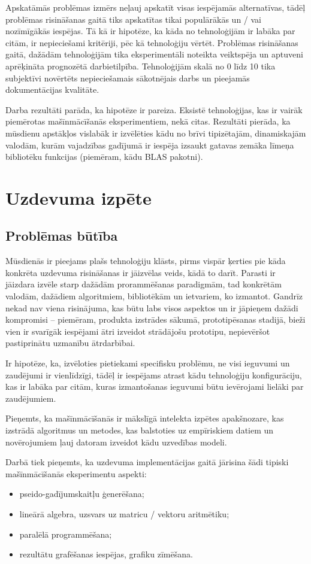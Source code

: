 \documentclass{ludis}
\begin{document}
Apskatāmās problēmas izmērs neļauj apskatīt visas iespējamās alternatīvas, tādēļ problēmas risināšanas gaitā tiks apskatītas tikai populārākās un / vai nozīmīgākās iespējas. Tā kā ir hipotēze, ka kāda no tehnoloģijām ir labāka par citām, ir nepieciešami kritēriji, pēc kā tehnoloģiju vērtēt. Problēmas risināšanas gaitā, dažādām tehnoloģijām tika eksperimentāli noteikta veiktspēja un aptuveni aprēķināta prognozētā darbietilpība. Tehnoloģijām skalā no 0 līdz 10 tika subjektīvi novērtēts nepieciešamais sākotnējais darbs un pieejamās dokumentācijas kvalitāte.

Darba rezultāti parāda, ka hipotēze ir pareiza. Eksistē tehnoloģijas, kas ir vairāk piemērotas mašīnmācīšanās eksperimentiem, nekā citas. Rezultāti pierāda, ka mūsdienu apstākļos vislabāk ir izvēlēties kādu no brīvi tipizētajām, dinamiskajām valodām, kurām vajadzības gadījumā ir iespēja izsaukt gatavas zemāka līmeņa bibliotēku funkcijas (piemēram, kādu BLAS pakotni).

\chapter{Uzdevuma izpēte}
\section{Problēmas būtība}
Mūsdienās ir pieejams plašs tehnoloģiju klāsts, pirms vispār ķerties pie kāda konkrēta uzdevuma risināšanas ir jāizvēlas veids, kādā to darīt. Parasti ir jāizdara izvēle starp dažādām prorammēšanas paradigmām, tad konkrētām valodām, dažādiem algoritmiem, bibliotēkām un ietvariem, ko izmantot. Gandrīz nekad nav viena risinājuma, kas būtu labs visos aspektos un ir jāpieņem dažādi kompromisi -- piemēram, produkta izstrādes sākumā, prototipēsanas stadijā, bieži vien ir svarīgāk iespējami ātri izveidot strādājošu prototipu, nepievēršot pastiprinātu uzmanību ātrdarbībai.

Ir hipotēze, ka, izvēloties pietiekami specifisku problēmu, ne visi ieguvumi un zaudējumi ir vienlīdzīgi, tādēļ ir iespējams atrast kādu tehnoloģiju konfigurāciju, kas ir labāka par citām, kuras izmantošanas ieguvumi būtu ievērojami lielāki par zaudējumiem.

Pieņemts, ka mašīnmācīšanās ir mākslīgā intelekta izpētes apakšnozare, kas izstrādā algoritmus un metodes, kas balstoties uz empīriskiem datiem un novērojumiem ļauj datoram izveidot kādu uzvedības modeli.

Darbā tiek pieņemts, ka uzdevuma implementācijas gaitā jārisina šādi tipiski mašīnmācīšanās eksperimentu aspekti:
\begin{itemize}
\item pseido-gadījumskaitļu ģenerēšana;
\item lineārā algebra, uzsvars uz matricu / vektoru aritmētiku;
\item paralēlā programmēšana;
\item rezultātu grafēšanas iespējas, grafiku zīmēšana.
\end{itemize}
\end{document}
